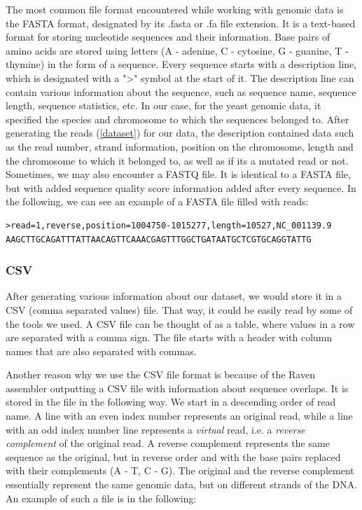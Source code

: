 \documentclass[times, utf8, diplomski, english]{fer_eng}
\begin{document}
The most common file format encountered while working with genomic data is the FASTA format, designated by its .fasta or .fa file extension. It is a text-based format for storing nucleotide sequences and their information. Base pairs of amino acids are stored using letters (A - adenine, C - cytosine, G - guanine, T - thymine) in the form of a sequence. Every sequence starts with a description line, which is designated with a ">" symbol at the start of it. The description line can contain various information about the sequence, such as sequence name, sequence length, sequence statistics, etc. In our case, for the yeast genomic data, it specified the species and chromosome to which the sequences belonged to. After generating the reads (\ref{dataset}) for our data, the description contained data such as the read number, strand information, position on the chromosome, length and the chromosome to which it belonged to, as well as if its a mutated read or not. Sometimes, we may also encounter a FASTQ file. It is identical to a FASTA file, but with added sequence quality score information added after every sequence. In the following, we can see an example of a FASTA file filled with reads:

\begin{lstlisting}
>read=1,reverse,position=1004750-1015277,length=10527,NC_001139.9
AAGCTTGCAGATTTATTAACAGTTCAAACGAGTTTGGCTGATAATGCTCGTGCAGGTATTG
\end{lstlisting}

\subsubsection{CSV}

After generating various information about our dataset, we would store it in a CSV (comma separated values) file. That way, it could be easily read by some of the tools we used. A CSV file can be thought of as a table, where values in a row are separated with a comma sign. The file starts with a header with column names that are also separated with commas.

Another reason why we use the CSV file format is because of the Raven assembler outputting a CSV file with information about sequence overlaps. It is stored in the file in the following way. We start in a descending order of read name. A line with an even index number represents an original read, while a line with an odd index number line represents a \textit{virtual} read, i.e. a \textit{reverse complement} of the original read. A reverse complement represents the same sequence as the original, but in reverse order and with the base pairs replaced with their complements (A - T, C - G). The original and the reverse complement essentially represent the same genomic data, but on different strands of the DNA. An example of such a file is in the following:
\end{document}
